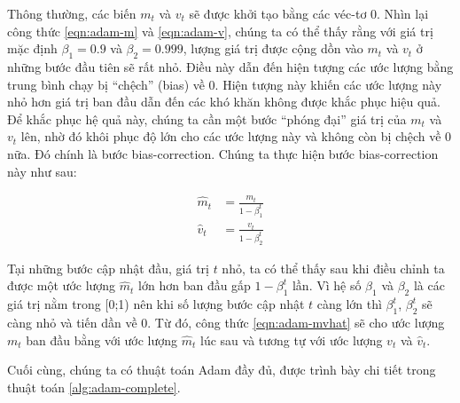 Thông thường, các biến $m_t$ và $v_t$ sẽ được khởi tạo bằng các véc-tơ 0. Nhìn lại công thức \ref{eqn:adam-m} và \ref{eqn:adam-v}, chúng ta có thể thấy rằng với giá trị mặc định $\beta_1=0.9$ và $\beta_2=0.999$, lượng giá trị được cộng dồn vào $m_t$ và $v_t$ ở những bước đầu tiên sẽ rất nhỏ. Điều này dẫn đến hiện tượng các ước lượng bằng trung bình chạy bị ``chệch'' (bias) về 0. Hiện tượng này khiến các ước lượng này nhỏ hơn giá trị ban đầu dẫn đến các khó khăn không được khắc phục hiệu quả. Để khắc phục hệ quả này, chúng ta cần một bước ``phóng đại'' giá trị của $m_t$ và $v_t$ lên, nhờ đó khôi phục độ lớn cho các ước lượng này và không còn bị chệch về 0 nữa. Đó chính là bước bias-correction. Chúng ta thực hiện bước bias-correction này như sau:

\begin{equation} \label{eqn:adam-mvhat}
	\begin{aligned}
		\hat m_t &= \frac{m_t}{1-\beta_1^t} \\
		\hat v_t &= \frac{v_t}{1-\beta_2^t}
	\end{aligned}
\end{equation}

Tại những bước cập nhật đầu, giá trị $t$ nhỏ, ta có thể thấy sau khi điều chỉnh ta được một ước lượng $\hat m_t$ lớn hơn ban đầu gấp $1 - \beta_1^t$ lần. Vì hệ số $\beta_1$ và $\beta_2$ là các giá trị nằm trong [0;1) nên khi số lượng bước cập nhật $t$ càng lớn thì $\beta_1^t$, $\beta_2^t$ sẽ càng nhỏ và tiến dần về 0. Từ đó, công thức \ref{eqn:adam-mvhat} sẽ cho ước lượng $m_t$ ban đầu bằng với ước lượng $\hat m_t$ lúc sau và tương tự với ước lượng $v_t$ và $\hat v_t$.

Cuối cùng, chúng ta có thuật toán Adam đầy đủ, được trình bày chi tiết trong thuật toán \ref{alg:adam-complete}.

